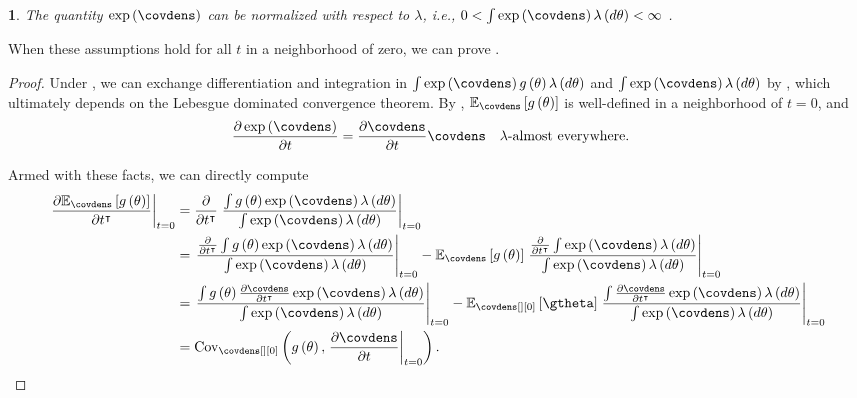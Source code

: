 \documentclass{article}\usepackage[]{graphicx}\usepackage[]{color}
\theoremstyle{plain}
\theoremstyle{definition}
\theoremstyle{plain}
\theoremstyle{plain}
\newtheorem{assumption}[thm]{\protect\assumptionname}
\theoremstyle{plain}
\theoremstyle{plain}
\providecommand{\assumptionname}{Assumption}
\begin{document}
\begin{assumption}
The quantity $\exp\left(\covdens\right)$ can be normalized with respect
to $\lambda$, i.e., $0<\int\exp\left(\covdens\right)\lambda\left(d\theta\right)<\infty$
.\label{assu:bayes_ok}

\end{assumption}

When these assumptions hold for all $t$ in a neighborhood of zero,
we can prove .
\begin{proof}
Under , we can exchange differentiation
and integration in $\int\exp\left(\covdens\right)g\left(\theta\right)\lambda\left(d\theta\right)$
and $\int\exp\left(\covdens\right)\lambda\left(d\theta\right)$ by
\citet[Chapter 5-11, Theorem 18]{fleming:1965:functions}, which ultimately
depends on the Lebesgue dominated convergence theorem. By ,
$\mbe_{\covdens}\left[g\left(\theta\right)\right]$ is well-defined
in a neighborhood of $t=0$, and
\begin{align*}
\frac{\partial\exp\left(\covdens\right)}{\partial t} & =\frac{\partial\covdens}{\partial t}\covdens\quad\lambda\textrm{-almost everywhere}.
\end{align*}

Armed with these facts, we can directly compute
\begin{align*}
\left.\frac{\partial\mbe_{\covdens}\left[g\left(\theta\right)\right]}{\partial t^{\trans}}\right|_{t=0} & =\frac{\partial}{\partial t^{\trans}}\left.\frac{\int g\left(\theta\right)\exp\left(\covdens\right)\lambda\left(d\theta\right)}{\int\exp\left(\covdens\right)\lambda\left(d\theta\right)}\right|_{t=0}\\
 & =\left.\frac{\frac{\partial}{\partial t^{\trans}}\int g\left(\theta\right)\exp\left(\covdens\right)\lambda\left(d\theta\right)}{\int\exp\left(\covdens\right)\lambda\left(d\theta\right)}\right|_{t=0}-\mbe_{\covdens}\left[g\left(\theta\right)\right]\left.\frac{\frac{\partial}{\partial t^{\trans}}\int\exp\left(\covdens\right)\lambda\left(d\theta\right)}{\int\exp\left(\covdens\right)\lambda\left(d\theta\right)}\right|_{t=0}\\
 & =\left.\frac{\int g\left(\theta\right)\frac{\partial\covdens}{\partial t^{\trans}}\exp\left(\covdens\right)\lambda\left(d\theta\right)}{\int\exp\left(\covdens\right)\lambda\left(d\theta\right)}\right|_{t=0}-\mbe_{\covdens[][0]}\left[\gtheta\right]\left.\frac{\int\frac{\partial\covdens}{\partial t^{\trans}}\exp\left(\covdens\right)\lambda\left(d\theta\right)}{\int\exp\left(\covdens\right)\lambda\left(d\theta\right)}\right|_{t=0}\\
 & =\cov_{\covdens[][0]}\left(g\left(\theta\right),\left.\frac{\partial\covdens}{\partial t}\right|_{t=0}\right).
\end{align*}
\end{proof}
\end{document}
